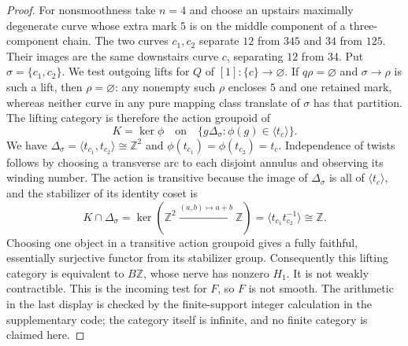\begin{proof}
For nonsmoothness take $n=4$ and choose an upstairs maximally degenerate curve whose extra mark $5$ is on the middle component of a three-component chain. The two curves $c_1,c_2$ separate $12$ from $345$ and $34$ from $125$. Their images are the same downstairs curve $c$, separating $12$ from $34$. Put $\sigma=\{c_1,c_2\}$. We test outgoing lifts for $Q$ of $[1]:\{c\}\to\varnothing$. If $q\rho=\varnothing$ and $\sigma\to\rho$ is such a lift, then $\rho=\varnothing$: any nonempty such $\rho$ encloses $5$ and one retained mark, whereas neither curve in any pure mapping class translate of $\sigma$ has that partition. The lifting category is therefore the action groupoid of
\[
 K=\ker\phi\quad\text{on}\quad
 \{g\Delta_\sigma:\phi(g)\in\langle t_c\rangle\}.
\]
We have $\Delta_\sigma=\langle t_{c_1},t_{c_2}\rangle\cong\mathbb Z^2$ and $\phi(t_{c_1})=\phi(t_{c_2})=t_c$. Independence of twists follows by choosing a transverse arc to each disjoint annulus and observing its winding number. The action is transitive because the image of $\Delta_\sigma$ is all of $\langle t_c\rangle$, and the stabilizer of its identity coset is
\[
 K\cap\Delta_\sigma
 =\ker(\mathbb Z^2\xrightarrow{(a,b)\mapsto a+b}\mathbb Z)
 =\langle t_{c_1}t_{c_2}^{-1}\rangle\cong\mathbb Z.
\]
Choosing one object in a transitive action groupoid gives a fully faithful, essentially surjective functor from its stabilizer group. Consequently this lifting category is equivalent to $B\mathbb Z$, whose nerve has nonzero $H_1$. It is not weakly contractible. This is the incoming test for $F$, so $F$ is not smooth. The arithmetic in the last display is checked by the finite-support integer calculation in the supplementary code; the category itself is infinite, and no finite category is claimed here.
\end{proof}

